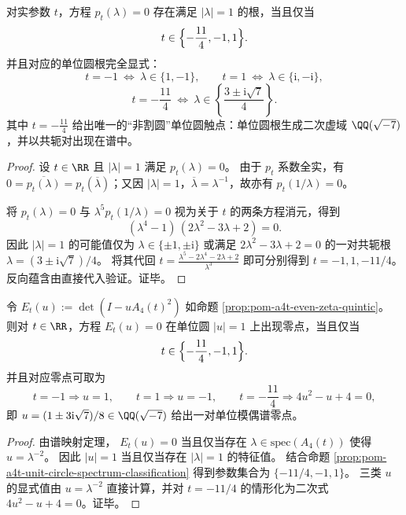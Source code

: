 \begin{proposition}[单位圆谱点的完全分类：仅三处实参数触碰 \texorpdfstring{$|\lambda|=1$}{|lambda|=1}]\label{prop:pom-a4t-unit-circle-spectrum-classification}
对实参数 \(t\)，方程 \(p_t(\lambda)=0\) 存在满足 \(|\lambda|=1\) 的根，当且仅当
\[
t\in\Bigl\{-\frac{11}{4},-1,1\Bigr\}.
\]
并且对应的单位圆根完全显式：
\[
t=-1\ \Longleftrightarrow\ \lambda\in\{1,-1\},
\qquad
t=1\ \Longleftrightarrow\ \lambda\in\{\mathrm{i},-\mathrm{i}\},
\]
\[
t=-\frac{11}{4}
\ \Longleftrightarrow\
\lambda\in\left\{\frac{3\pm \mathrm{i}\sqrt7}{4}\right\}.
\]
其中 \(t=-\frac{11}{4}\) 给出唯一的“非割圆”单位圆触点：单位圆根生成二次虚域 \(\QQ(\sqrt{-7})\)，并以共轭对出现在谱中。
\end{proposition}
\begin{proof}
设 \(t\in\RR\) 且 \(|\lambda|=1\) 满足 \(p_t(\lambda)=0\)。
由于 \(p_t\) 系数全实，有 \(0=\overline{p_t(\lambda)}=p_t(\overline\lambda)\)；又因 \(|\lambda|=1\)，\(\overline\lambda=\lambda^{-1}\)，故亦有 \(p_t(1/\lambda)=0\)。
\par
将 \(p_t(\lambda)=0\) 与 \(\lambda^5p_t(1/\lambda)=0\) 视为关于 \(t\) 的两条方程消元，得到
\[
(\lambda^4-1)\,(2\lambda^2-3\lambda+2)=0.
\]
因此 \(|\lambda|=1\) 的可能值仅为 \(\lambda\in\{\pm1,\pm\mathrm{i}\}\) 或满足 \(2\lambda^2-3\lambda+2=0\) 的一对共轭根 \(\lambda=(3\pm \mathrm{i}\sqrt7)/4\)。
将其代回
\(
t=\frac{\lambda^5-2\lambda^4-2\lambda+2}{\lambda^3}
\)
即可分别得到 \(t=-1,1,-11/4\)。
反向蕴含由直接代入验证。证毕。
\end{proof}

\begin{corollary}\label{cor:pom-a4t-even-spectrum-unit-circle-touchpoints}
令 \(E_t(u):=\det(I-uA_4(t)^2)\) 如命题 \ref{prop:pom-a4t-even-zeta-quintic}。
则对 \(t\in\RR\)，方程 \(E_t(u)=0\) 在单位圆 \(|u|=1\) 上出现零点，当且仅当
\[
t\in\Bigl\{-\frac{11}{4},-1,1\Bigr\}.
\]
并且对应零点可取为
\[
t=-1\Rightarrow u=1,
\qquad
t=1\Rightarrow u=-1,
\qquad
t=-\frac{11}{4}\Rightarrow 4u^{2}-u+4=0,
\]
即 \(u=(1\pm 3\mathrm{i}\sqrt7)/8\in\QQ(\sqrt{-7})\) 给出一对单位模偶谱零点。
\end{corollary}
\begin{proof}
由谱映射定理，
\(
E_t(u)=0
\)
当且仅当存在 \(\lambda\in\mathrm{spec}(A_4(t))\) 使得 \(u=\lambda^{-2}\)。
因此 \(|u|=1\) 当且仅当存在 \(|\lambda|=1\) 的特征值。
结合命题 \ref{prop:pom-a4t-unit-circle-spectrum-classification} 得到参数集合为 \(\{-11/4,-1,1\}\)。
三类 \(u\) 的显式值由 \(u=\lambda^{-2}\) 直接计算，并对 \(t=-11/4\) 的情形化为二次式 \(4u^2-u+4=0\)。证毕。
\end{proof}

